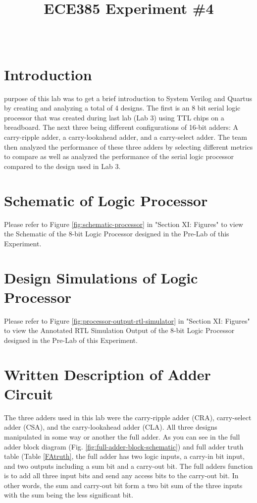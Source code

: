 \documentclass[journal, twocolumn, final,11pt,letterpaper]{IEEEtran}
\title{ECE385 Experiment \#4
	}
\author{
\IEEEauthorblockN{Eric Meyers, Ryan Helsdingen}\\
\IEEEauthorblockA{Section ABG; TAs: Ben Delay, Shuo Liu \\
February 17th, 2016 \\
emeyer7, helsdin2}}
\begin{document}
	
\maketitle
\singlespacing

\section{Introduction}
 purpose of this lab was to get a brief introduction to System Verilog and Quartus by creating and analyzing a total of 4 designs. The first is an 8 bit serial logic processor that was created during last lab (Lab 3) using TTL chips on a breadboard. The next three being different configurations of 16-bit adders: A carry-ripple adder, a carry-lookahead adder, and a carry-select adder. The team then analyzed the performance of these three adders by selecting different metrics to compare as well as analyzed the performance of the serial logic processor compared to the design used in Lab 3.

\section{Schematic of Logic Processor}
Please refer to Figure \ref{fig:schematic-processor} in "Section XI: Figures" to view the Schematic of the 8-bit Logic Processor designed in the Pre-Lab of this Experiment.

\section{Design Simulations of Logic Processor}
Please refer to Figure \ref{fig:processor-output-rtl-simulator} in "Section XI: Figures" to view the Annotated RTL Simulation Output of the 8-bit Logic Processor designed in the Pre-Lab of this Experiment.

\section{Written Description of Adder Circuit}
The three adders used in this lab were the carry-ripple adder (CRA), carry-select adder (CSA), and the carry-lookahead adder (CLA).  All three designs manipulated in some way or another the full adder.  As you can see in the full adder block diagram (Fig. \ref{fig:full-adder-block-schematic}) and full adder truth table (Table \ref{FAtruth}, the full adder has two logic inputs, a carry-in bit input, and two outputs including a sum bit and a carry-out bit.  The full adders function is to add all three input bits and send any access bits to the carry-out bit.  In other words, the sum and carry-out bit form a two bit sum of the three inputs with the sum being the less significant bit.  \\
   
\end{document}
